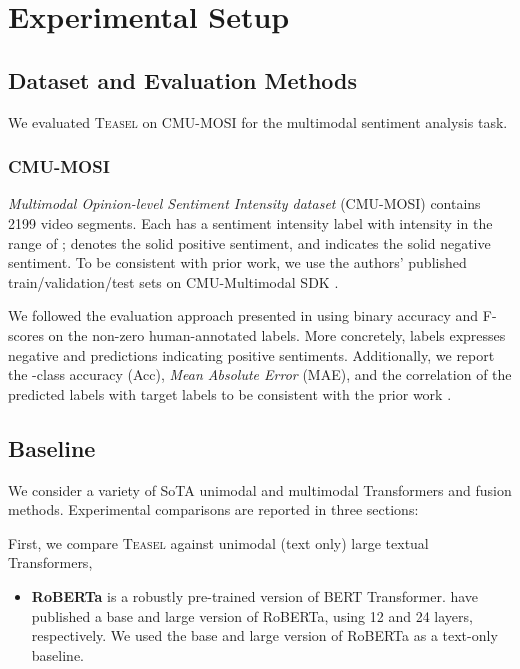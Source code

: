 \documentclass[letterpaper]{article} \usepackage{spconf,amsmath,graphicx}
\newcommand{\teasel}{\textsc{Teasel }}
\begin{document}
\section{Experimental Setup}
\label{sec:experimental setup}


\subsection{Dataset and Evaluation Methods}
We evaluated \teasel on CMU-MOSI \cite{zadeh2016mosi} for the multimodal sentiment analysis task.



\subsubsection{CMU-MOSI} 
\textit{Multimodal Opinion-level Sentiment Intensity dataset} (CMU-MOSI) \cite{zadeh2016mosi} contains 2199 video segments. Each has a sentiment intensity label with intensity in the range of ;   denotes the solid positive sentiment, and  indicates the solid negative sentiment. To be consistent with prior work, we use the authors' published train/validation/test sets on CMU-Multimodal SDK \cite{zadeh2018multi}. 







We followed the evaluation approach presented in \cite{tsai2019MULT} using binary accuracy and F-scores on the non-zero human-annotated labels. More concretely,  labels expresses negative and  predictions indicating positive sentiments. Additionally, we report the -class accuracy (Acc), \textit{Mean Absolute Error} (MAE), and the correlation of the predicted labels with target labels to be consistent with the prior work \cite{zadeh2017tensor, liu2018efficient, tsai2018learning}.




\subsection{Baseline}
\label{ssec:baseline}

We consider a variety of SoTA unimodal and multimodal Transformers and fusion methods.
Experimental comparisons are reported in three sections:

First, we compare \teasel against unimodal (text only) large textual Transformers,

\begin{itemize}
    \item \textbf{RoBERTa}
    \cite{liu2019roberta} is a robustly pre-trained version of BERT Transformer. \cite{liu2019roberta} have published a base and large version of RoBERTa, using 12 and 24 layers, respectively. We used the base and large version of RoBERTa as a text-only baseline.
\end{itemize}
\end{document}
